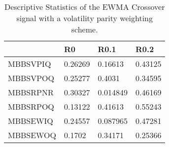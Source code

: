 \begin{table}[H]
\centering
\begin{tabular}{llll}
\hline& R0 & R0.1 & R0.2 \\ 
\hline 
MBBSVPIQ & 0.26269 & 0.16613 & 0.43125 \\ 
MBBSVPOQ & 0.25277 & 0.4031 & 0.34595 \\ 
MBBSRPNR & 0.30327 & 0.014849 & 0.46169 \\ 
MBBSRPOQ & 0.13122 & 0.41613 & 0.55243 \\ 
MBBSEWIQ & 0.24557 & 0.087965 & 0.47281 \\ 
MBBSEWOQ & 0.1702 & 0.34171 & 0.25366 \\ 
\hline
\end{tabular}
\caption{Descriptive Statistics of the EWMA Crossover signal with a volatility parity weighting scheme.}
\label{MBBS_corrregime}
\end{table}